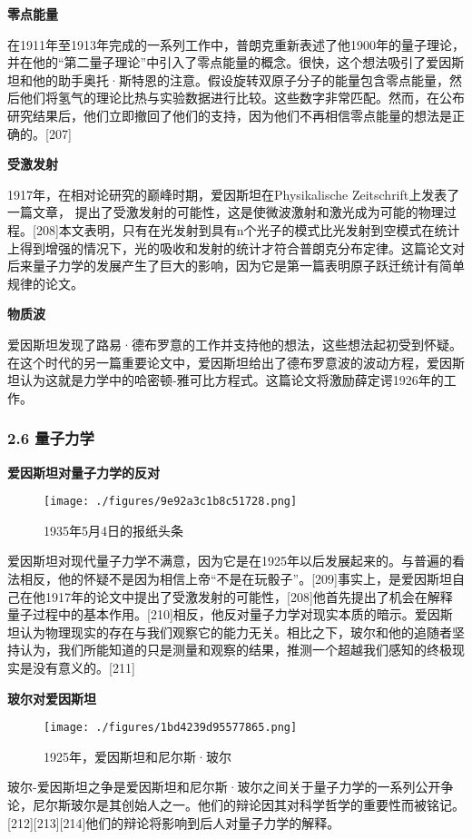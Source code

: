\textbf{零点能量}

在1911年至1913年完成的一系列工作中，普朗克重新表述了他1900年的量子理论，并在他的“第二量子理论”中引入了零点能量的概念。很快，这个想法吸引了爱因斯坦和他的助手奥托·斯特恩的注意。假设旋转双原子分子的能量包含零点能量，然后他们将氢气的理论比热与实验数据进行比较。这些数字非常匹配。然而，在公布研究结果后，他们立即撤回了他们的支持，因为他们不再相信零点能量的想法是正确的。[207]

\textbf{受激发射}

1917年，在相对论研究的巅峰时期，爱因斯坦在Physikalische Zeitschrift上发表了一篇文章， 提出了受激发射的可能性，这是使微波激射和激光成为可能的物理过程。[208]本文表明，只有在光发射到具有n个光子的模式比光发射到空模式在统计上得到增强的情况下，光的吸收和发射的统计才符合普朗克分布定律。这篇论文对后来量子力学的发展产生了巨大的影响，因为它是第一篇表明原子跃迁统计有简单规律的论文。

\textbf{物质波}

爱因斯坦发现了路易·德布罗意的工作并支持他的想法，这些想法起初受到怀疑。在这个时代的另一篇重要论文中，爱因斯坦给出了德布罗意波的波动方程，爱因斯坦认为这就是力学中的哈密顿-雅可比方程式。这篇论文将激励薛定谔1926年的工作。

\subsubsection{2.6 量子力学}
\textbf{爱因斯坦对量子力学的反对}
\begin{figure}[ht]
\centering
\texttt{[image: ./figures/9e92a3c1b8c51728.png]}
\caption{1935年5月4日的报纸头条} \label{fig_AYST_21}
\end{figure}
爱因斯坦对现代量子力学不满意，因为它是在1925年以后发展起来的。与普遍的看法相反，他的怀疑不是因为相信上帝“不是在玩骰子”。[209]事实上，是爱因斯坦自己在他1917年的论文中提出了受激发射的可能性，[208]他首先提出了机会在解释量子过程中的基本作用。[210]相反，他反对量子力学对现实本质的暗示。爱因斯坦认为物理现实的存在与我们观察它的能力无关。相比之下，玻尔和他的追随者坚持认为，我们所能知道的只是测量和观察的结果，推测一个超越我们感知的终极现实是没有意义的。[211]

\textbf{玻尔对爱因斯坦}

\begin{figure}[ht]
\centering
\texttt{[image: ./figures/1bd4239d95577865.png]}
\caption{1925年，爱因斯坦和尼尔斯·玻尔} \label{fig_AYST_22}
\end{figure}
玻尔-爱因斯坦之争是爱因斯坦和尼尔斯·玻尔之间关于量子力学的一系列公开争论，尼尔斯玻尔是其创始人之一。他们的辩论因其对科学哲学的重要性而被铭记。[212][213][214]他们的辩论将影响到后人对量子力学的解释。

